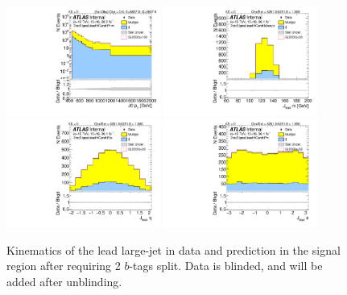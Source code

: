 \clearpage

\begin{figure}[htbp!]
\begin{center}
\includegraphics[width=0.45\textwidth,angle=-90]{figures/boosted/Signal/b77_TwoTag_split_Signal_leadHCand_Pt_m_1_blind.pdf}
\includegraphics[width=0.45\textwidth,angle=-90]{figures/boosted/Signal/b77_TwoTag_split_Signal_leadHCand_Mass_s_blind.pdf}\\
\includegraphics[width=0.45\textwidth,angle=-90]{figures/boosted/Signal/b77_TwoTag_split_Signal_leadHCand_Eta_blind.pdf}
\includegraphics[width=0.45\textwidth,angle=-90]{figures/boosted/Signal/b77_TwoTag_split_Signal_leadHCand_Phi_blind.pdf}
  \caption{Kinematics of the lead large-\R jet in data and prediction in the signal region after requiring 2 $b$-tags split. Data is blinded, and will be added after unblinding.}
  \label{fig:boosted-2bs-signal-blind-ak10-lead}
\end{center}
\end{figure}

